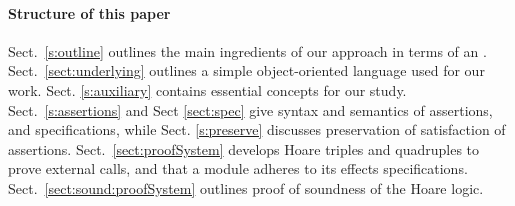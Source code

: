  \paragraph{Structure of this paper}
Sect.\ \ref{s:outline}   outlines the main ingredients of our approach in terms of an .
Sect.\ \ref{sect:underlying} outlines a simple object-oriented language used for our work. 
 Sect. \ref{s:auxiliary}  {contains essential concepts for our study}.
Sect.\ \ref{s:assertions} and 
 Sect \ref{sect:spec}  give syntax and semantics of assertions, and  specifications,
{while Sect. \ref{s:preserve} discusses preservation of satisfaction of assertions.}
Sect.\ \ref{sect:proofSystem} develops Hoare triples and quadruples to prove external calls, and that a module adheres to its \tamed effects specifications.
Sect.\ \ref{sect:sound:proofSystem} outlines  proof of soundness of
the Hoare logic. 

 

